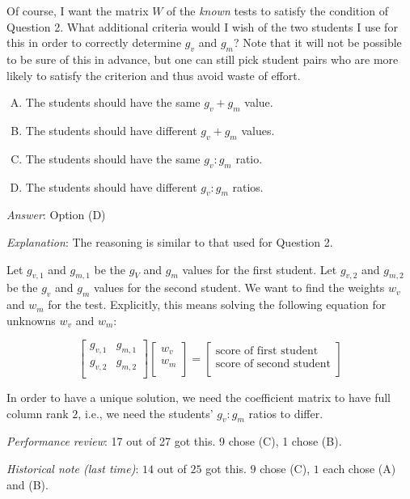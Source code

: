 \documentclass[10pt]{amsart}
\begin{document}
\begin{enumerate}
  Of course, I want the matrix $W$ of the {\em known} tests to satisfy
  the condition of Question 2. What additional criteria would I wish
  of the two students I use for this in order to correctly determine
  $g_v$ and $g_m$? Note that it will not be possible to be sure of
  this in advance, but one can still pick student pairs who are more
  likely to satisfy the criterion and thus avoid waste of effort.

  \begin{enumerate}[(A)]
  \item The students should have the same $g_v + g_m$ value.
  \item The students should have different $g_v + g_m$ values.
  \item The students should have the same $g_v:g_m$ ratio.
  \item The students should have different $g_v:g_m$ ratios.
  \end{enumerate}

  {\em Answer}: Option (D)

  {\em Explanation}: The reasoning is similar to that used for Question 2.

  Let $g_{v,1}$ and $g_{m,1}$ be the $g_V$ and $g_m$ values for the
  first student. Let $g_{v,2}$ and $g_{m,2}$ be the $g_v$ and $g_m$
  values for the second student. We want to find the weights $w_v$ and
  $w_m$ for the test. Explicitly, this means solving the following
  equation for unknowns $w_v$ and $w_m$:

  $$\left[\begin{matrix} g_{v,1} & g_{m,1} \\ g_{v,2} & g_{m,2} \\\end{matrix}\right]\left[\begin{matrix} w_v \\ w_m \\\end{matrix}\right] = \left[\begin{matrix} \text{score of first student} \\ \text{score of second student} \\\end{matrix}\right]$$

  In order to have a unique solution, we need the coefficient matrix
  to have full column rank $2$, i.e., we need the students' $g_v:g_m$
  ratios to differ.

  {\em Performance review}: 17 out of 27 got this. 9 chose (C), 1 chose (B).

  {\em Historical note (last time)}: $14$ out of $25$ got this. $9$ chose (C),
  $1$ each chose (A) and (B).
\end{enumerate}
\end{document}
